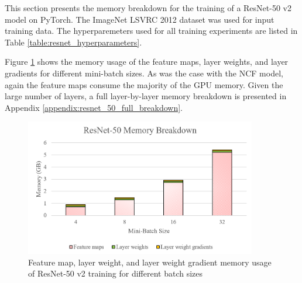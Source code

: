\documentclass[12pt,letterpaper]{article}
\begin{document}
%
%

This section presents the memory breakdown for the training of a ResNet-50 v2 \cite{resnet} model on PyTorch. The ImageNet LSVRC 2012 dataset \cite{imagenet2012} was used for input training data. The hyperparemeters used for all training experiments are listed in Table \ref{table:resnet_hyperparameters}.

\begin{table}[H]
\centering
{}
\caption{Hyperparameters used for ResNet-50 v2 memory profiling experiments}
\label{table:resnet_hyperparameters}
\end{table}

Figure \ref{fig:resnet_bar_graph} shows the memory usage of the feature maps, layer weights, and layer gradients for different mini-batch sizes. As was the case with the NCF model, again the feature maps consume the majority of the GPU memory. Given the large number of layers, a full layer-by-layer memory breakdown is presented in Appendix \ref{appendix:resnet_50_full_breakdown}.
\begin{figure}[H]
\centering
\includegraphics[width=0.9\textwidth]{resnet_bar_graphs.PNG}
\captionsetup{width=0.8\linewidth}
\caption{Feature map, layer weight, and layer weight gradient memory usage of ResNet-50 v2 training for different batch sizes}
\label{fig:resnet_bar_graph}
\end{figure}
\end{document}
